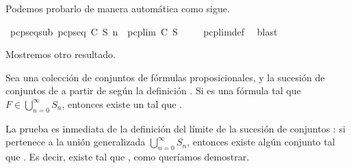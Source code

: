 \begin{isabellebody}
%
\endisatagproof
{\isafoldproof}%
%
\isadelimproof
%
\endisadelimproof
%
\begin{isamarkuptext}%
Podemos probarlo de manera automática como sigue.%
\end{isamarkuptext}\isamarkuptrue%
\isamarkupfalse%
\ pcp{\isacharunderscore}seq{\isacharunderscore}sub{\isacharcolon}\ {\isachardoublequoteopen}pcp{\isacharunderscore}seq\ C\ S\ n\ {\isasymsubseteq}\ pcp{\isacharunderscore}lim\ C\ S{\isachardoublequoteclose}\ \isanewline
%
\isadelimproof
\ \ %
\endisadelimproof
%
\isatagproof
{}\isamarkupfalse%
\ pcp{\isacharunderscore}lim{\isacharunderscore}def\ \isamarkupfalse%
\ blast%
\endisatagproof
{\isafoldproof}%
%
\isadelimproof
%
\endisadelimproof
%
\begin{isamarkuptext}%
Mostremos otro resultado. 

  \begin{lema}
    Sea  una colección de conjuntos de fórmulas proposicionales,  y  la sucesión de 
    conjuntos de  a partir de  según la definición . Si  es una fórmula tal que
    $F \in \bigcup_{n = 0}^{\infty} S_{n}$, entonces existe un  tal que . 
  \end{lema}

  \begin{demostracion}
    La prueba es inmediata de la definición del límite de la sucesión de conjuntos : si
     pertenece a la unión generalizada $\bigcup_{n = 0}^{\infty} S_{n}$, entonces existe algún
    conjunto  tal que . Es decir, existe  tal que , como queríamos
    demostrar.
  \end{demostracion} 


\end{isamarkuptext}
\end{isabellebody}
